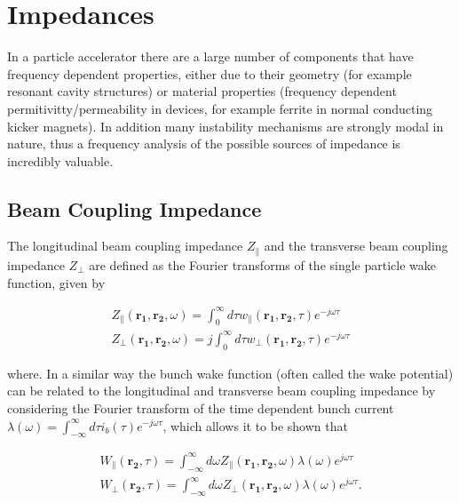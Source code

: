 \section{Impedances}

In a particle accelerator there are a large number of components that have frequency dependent properties, either due to their geometry (for example resonant cavity structures) or material properties (frequency dependent permitivitty/permeability in devices, for example ferrite in normal conducting kicker magnets). In addition many instability mechanisms are strongly modal in nature, thus a frequency analysis of the possible sources of impedance is incredibly valuable. 

\subsection{Beam Coupling Impedance}

The longitudinal beam coupling impedance $Z_{\parallel}$ and the transverse beam coupling impedance $Z_{\perp}$ are defined as the Fourier transforms of the single particle wake function, given by

\begin{align}
Z_{\parallel} \left(\mathbf{r_{1}}, \mathbf{r_{2}}, \omega  \right) = \int^{\infty}_{0} d\tau w_{\parallel} \left(\mathbf{r_{1}}, \mathbf{r_{2}}, \tau  \right) e^{-j\omega \tau}\\
Z_{\perp} \left(\mathbf{r_{1}}, \mathbf{r_{2}}, \omega  \right) = j \int^{\infty}_{0} d\tau w_{\perp} \left(\mathbf{r_{1}}, \mathbf{r_{2}}, \tau  \right) e^{-j\omega \tau} \label{eqn:total_trans_imp}
\end{align}

where. In a similar way the bunch wake function (often called the wake potential) can be related to the longitudinal and transverse beam coupling impedance by considering the Fourier transform of the time dependent bunch current $\lambda \left( \omega  \right) = \int^{\infty}_{-\infty} d\tau i_{b}\left( \tau \right) e^{-j \omega \tau}$, which allows it to be shown that

\begin{align}
W_{\parallel}  \left( \mathbf{r_{2}}, \tau \right) = \int^{\infty}_{- \infty} d \omega Z_{\parallel} \left(\mathbf{r_{1}}, \mathbf{r_{2}}, \omega  \right) \lambda \left( \omega  \right) e^{j \omega \tau} \\
W_{\perp}  \left( \mathbf{r_{2}}, \tau \right) = \int^{\infty}_{- \infty} d \omega Z_{\perp} \left(\mathbf{r_{1}}, \mathbf{r_{2}}, \omega  \right) \lambda \left( \omega  \right) e^{j \omega \tau}.
\end{align}

